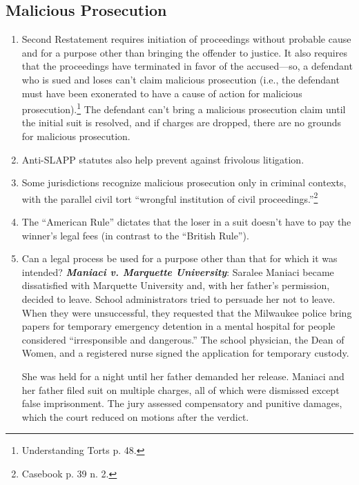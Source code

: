 \subsection{Malicious Prosecution}

\begin{enumerate}
    \item Second Restatement requires initiation of proceedings without probable cause and for a purpose other than bringing the offender to justice. It also requires that the proceedings have terminated in favor of the accused---so, a defendant who is sued and loses can't claim malicious prosecution (i.e., the defendant must have been exonerated to have a cause of action for malicious prosecution).\footnote{Understanding Torts p. 48.} The defendant can't bring a malicious prosecution claim until the initial suit is resolved, and if charges are dropped, there are no grounds for malicious prosecution. %
    \item Anti-SLAPP statutes also help prevent against frivolous litigation.
    \item Some jurisdictions recognize malicious prosecution only in criminal contexts, with the parallel civil tort ``wrongful institution of civil proceedings.''\footnote{Casebook p. 39 n. 2.}
    \item The ``American Rule'' dictates that the loser in a suit doesn't have to pay the winner's legal fees (in contrast to the ``British Rule'').
    \item Can a legal process be used for a purpose other than that for which it was intended? \textbf{\emph{Maniaci v. Marquette University}}: Saralee Maniaci became dissatisfied with Marquette University and, with her father's permission, decided to leave. School administrators tried to persuade her not to leave. When they were unsuccessful, they requested that the Milwaukee police bring papers for temporary emergency detention in a mental hospital for people considered ``irresponsible and dangerous.'' The school physician, the Dean of Women, and a registered nurse signed the application for temporary custody.

She was held for a night until her father demanded her release. Maniaci and her father filed suit on multiple charges, all of which were dismissed except false imprisonment. The jury assessed compensatory and punitive damages, which the court reduced on motions after the verdict.


\end{enumerate}
